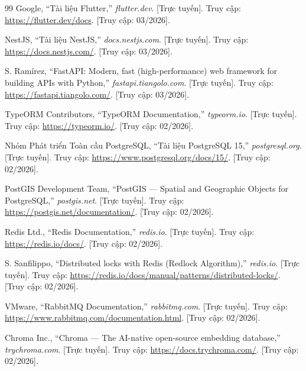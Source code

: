 \renewcommand{\bibname}{Tài liệu tham khảo}

\begin{thebibliography}{99}
Google, ``Tài liệu Flutter,'' \textit{flutter.dev}. [Trực tuyến]. Truy cập: \url{https://flutter.dev/docs}. [Truy cập: 03/2026].

NestJS, ``Tài liệu NestJS,'' \textit{docs.nestjs.com}. [Trực tuyến]. Truy cập: \url{https://docs.nestjs.com/}. [Truy cập: 03/2026].

S. Ramírez, ``FastAPI: Modern, fast (high-performance) web framework for building APIs with Python,'' \textit{fastapi.tiangolo.com}. [Trực tuyến]. Truy cập: \url{https://fastapi.tiangolo.com/}. [Truy cập: 03/2026].

TypeORM Contributors, ``TypeORM Documentation,'' \textit{typeorm.io}. [Trực tuyến]. Truy cập: \url{https://typeorm.io/}. [Truy cập: 02/2026].

Nhóm Phát triển Toàn cầu PostgreSQL, ``Tài liệu PostgreSQL 15,'' \textit{postgresql.org}. [Trực tuyến]. Truy cập: \url{https://www.postgresql.org/docs/15/}. [Truy cập: 02/2026].

PostGIS Development Team, ``PostGIS --- Spatial and Geographic Objects for PostgreSQL,'' \textit{postgis.net}. [Trực tuyến]. Truy cập: \url{https://postgis.net/documentation/}. [Truy cập: 02/2026].

Redis Ltd., ``Redis Documentation,'' \textit{redis.io}. [Trực tuyến]. Truy cập: \url{https://redis.io/docs/}. [Truy cập: 02/2026].

S. Sanfilippo, ``Distributed locks with Redis (Redlock Algorithm),'' \textit{redis.io}. [Trực tuyến]. Truy cập: \url{https://redis.io/docs/manual/patterns/distributed-locks/}. [Truy cập: 02/2026].

VMware, ``RabbitMQ Documentation,'' \textit{rabbitmq.com}. [Trực tuyến]. Truy cập: \url{https://www.rabbitmq.com/documentation.html}. [Truy cập: 02/2026].

Chroma Inc., ``Chroma --- The AI-native open-source embedding database,'' \textit{trychroma.com}. [Trực tuyến]. Truy cập: \url{https://docs.trychroma.com/}. [Truy cập: 02/2026].


\end{thebibliography}
